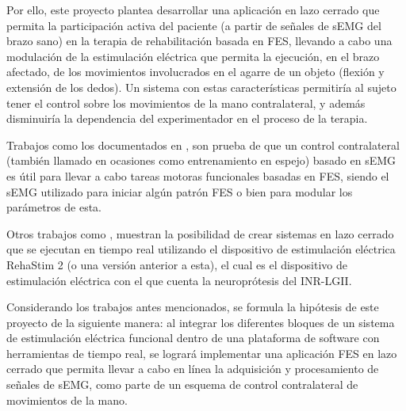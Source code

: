 Por ello, este proyecto plantea desarrollar una aplicación en lazo cerrado que permita la participación activa del paciente (a partir de señales de sEMG del brazo sano) en la terapia de rehabilitación basada en FES, llevando a cabo una modulación de la estimulación eléctrica que permita la ejecución, en el brazo afectado, de los movimientos involucrados en el agarre de un objeto (flexión y extensión de los dedos). Un sistema con estas características permitiría al sujeto tener el control sobre los movimientos de la mano contralateral, y además disminuiría la dependencia del experimentador en el proceso de la terapia.

Trabajos como los documentados en \cite{Zhou2018} \cite{Kim2015} \cite{Yi2013} \cite{Fonseca2019}, son prueba de que un control contralateral (también llamado en ocasiones como entrenamiento en espejo) basado en sEMG es útil para llevar a cabo tareas motoras funcionales basadas en FES, siendo el sEMG utilizado para iniciar algún patrón FES o bien para modular los parámetros de esta.

Otros trabajos como \cite{Salchow2016} \cite{Sun2014} \cite{Woods2018}, muestran la posibilidad de crear sistemas en lazo cerrado que se ejecutan en tiempo real utilizando el dispositivo de estimulación eléctrica RehaStim 2 (o una versión anterior a esta), el cual es el dispositivo de estimulación eléctrica con el que cuenta la neuroprótesis del INR-LGII.



Considerando los trabajos antes mencionados, se formula la hipótesis de este proyecto de la siguiente manera: al integrar los diferentes bloques de un sistema de estimulación eléctrica funcional dentro de una plataforma de software con herramientas de tiempo real, se logrará implementar una aplicación FES en lazo cerrado que permita llevar a cabo en línea la adquisición y procesamiento de señales de sEMG, como parte de un esquema de control contralateral de movimientos de la mano.

